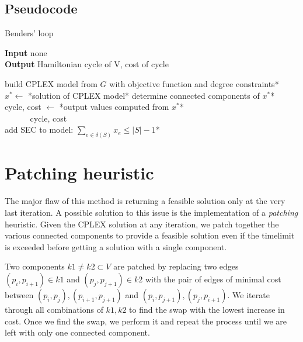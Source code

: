 \subsection{Pseudocode}
\begin{algorithm}[h]
    \caption{Benders' loop}

    \textbf{Input} none\\
    \textbf{Output} Hamiltonian cycle of V, cost of cycle\\
    \begin{algorithmic}

        \State *build CPLEX model from $G$ with objective function and degree constraints*\\
            \State $x^* \gets$ *solution of CPLEX model*
            \State *determine connected components of $x^*$*\\

                \State cycle, cost $\gets$ *output values computed from $x^*$*\\
                $\quad\;\;\quad\;\;$\Return cycle, cost
            \EndIf\\

                \State *add SEC to model: $\sum_{e\in\delta(S)}x_e\leq|S|-1$*
            \EndFor
        \EndWhile

    \end{algorithmic}
\end{algorithm}
\FloatBarrier

\section{Patching heuristic}
The major flaw of this method is returning a feasible solution only at the very last iteration. A possible solution to this issue is the implementation of a \textit{patching} heuristic. Given the CPLEX solution at any iteration, we patch together the various connected components to provide a feasible solution even if the timelimit is exceeded before getting a solution with a single component.

Two components $k1\neq k2\subset V$ are patched by replacing two edges $(p_i, p_{i+1})\in k1$ and $(p_j, p_{j+1})\in k2$ with the pair of edges of minimal cost between $(p_i,p_j), (p_{i+1},p_{j+1})$ and $(p_i,p_{j+1}),(p_j, p_{i+1})$. We iterate through all combinations of $k1,k2$ to find the swap with the lowest increase in cost. Once we find the swap, we perform it and repeat the process until we are left with only one connected component.

